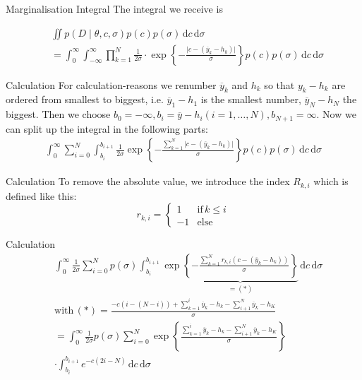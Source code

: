 \documentclass{beamer}
\newcommand{\dx}{\, \mathrm{d}}
\begin{document}
	\begin{frame}{Marginalisation Integral}
		The integral we receive is

		\begin{align}
    		&\iint p(D \mid \theta, c, \sigma) p(c) p(\sigma) \dx c \dx \sigma \\
    		&= \int_0^{\infty} \int_{-\infty}^{\infty} \prod_{k = 1}^N \frac{1}					{2\sigma} \cdot \exp \left\{- \frac{\lvert c - (\overline{y}_k -h_k) \lvert}					{\sigma} \right\} p(c) p(\sigma) \dx c \dx \sigma
		\end{align}
	\end{frame}
	
	\begin{frame}{Calculation}
		For calculation-reasons we renumber $\overline{y}_k$ and $h_k$ so that $y_k - h_k$ 			are ordered from smallest to biggest, i.e. $\overline{y}_1 - h_1$ is the smallest 			number, $\overline{y}_N - h_N$ the biggest.
		Then we choose $b_0 = -\infty, b_i = \overline{y}- h_i (i = 1, \ldots, N), b_{N+1} = 		\infty$. Now we can split up the integral in the following parts:
		\begin{align}
    		\int_0^{\infty} \sum_{i = 0}^N \int_{b_i}^{b_{i+1}} \frac{1}{2\sigma} 				\exp \left\{- \frac{\sum_{k = 1}^N \lvert c - (\overline{y}_k - h_k)\lvert} 					{\sigma} \right\} p(c) p(\sigma) \dx c \dx \sigma
		\end{align}
	\end{frame}
	
	\begin{frame}{Calculation}
		To remove the absolute value, we introduce the index $R_{k, i}$ which is 			defined like this:
		\[
			r_{k, i} =
			\begin{cases}
    			1 & \text{if} \, k \leq i \\
    			-1 & \text{else}
			\end{cases}
		\]
	\end{frame}
	
	\begin{frame}{Calculation}
		\begin{align}
    		&\int_0^{\infty} \frac{1}{2\sigma} \sum_{i = 0}^N p(\sigma) \int_{b_i}				^{b_{i+1}} \exp \underbrace{\left\{-\frac{\sum_{k = 1}^N r_{k, i} (c - 			(\overline{y}_k - h_k))}{\sigma} \right\}}_{= (*)} \dx c \dx\sigma \\
    		&\text{with} \, (*) = \frac{-c (i - (N -i)) + \sum_{k = 1}^i \overline{y}_k - 				h_k - \sum_{i + 1}^N \overline{y}_k - h_K}{\sigma} \\
    		&= \int_0^\infty \frac{1}{2\sigma} p(\sigma) \sum_{i = 0}^N \exp \left				\{\frac{\sum_{k = 1}^i \overline{y}_k - h_k - \sum_{i + 1}^N \overline{y}_k - h_K}{\sigma}				\right\} \\ \
    		&\cdot \int_{b_i}^{b_{i + 1}} e^{-c(2i -N)} \dx c \dx \sigma
		\end{align}
	\end{frame}
	
\end{document}
